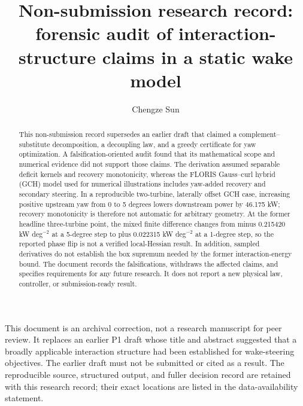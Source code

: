 \documentclass[wes, manuscript]{copernicus}
\begin{document}
\title{Non-submission research record: forensic audit of interaction-structure claims in a static wake model}
\author[1]{Chengze Sun}
\received{}
\pubdiscuss{}
\revised{}
\accepted{}
\published{}

\maketitle

\begin{abstract}
This non-submission record supersedes an earlier draft that claimed a complement--substitute decomposition, a decoupling law, and a greedy certificate for yaw optimization. A falsification-oriented audit found that its mathematical scope and numerical evidence did not support those claims. The derivation assumed separable deficit kernels and recovery monotonicity, whereas the FLORIS Gauss--curl hybrid (GCH) model used for numerical illustrations includes yaw-added recovery and secondary steering. In a reproducible two-turbine, laterally offset GCH case, increasing positive upstream yaw from 0 to 5 degrees lowers downstream power by 46.175 kW; recovery monotonicity is therefore not automatic for arbitrary geometry. At the former headline three-turbine point, the mixed finite difference changes from minus 0.215420 kW deg$^{-2}$ at a 5-degree step to plus 0.022315 kW deg$^{-2}$ at a 1-degree step, so the reported phase flip is not a verified local-Hessian result. In addition, sampled derivatives do not establish the box supremum needed by the former interaction-energy bound. The document records the falsifications, withdraws the affected claims, and specifies requirements for any future research. It does not report a new physical law, controller, or submission-ready result.
\end{abstract}

\introduction
\label{sec:introduction}

This document is an archival correction, not a research manuscript for peer review. It replaces an earlier P1 draft whose title and abstract suggested that a broadly applicable interaction structure had been established for wake-steering objectives. The earlier draft must not be submitted or cited as a result. The reproducible source, structured output, and fuller decision record are retained with this research record; their exact locations are listed in the data-availability statement.
\end{document}
